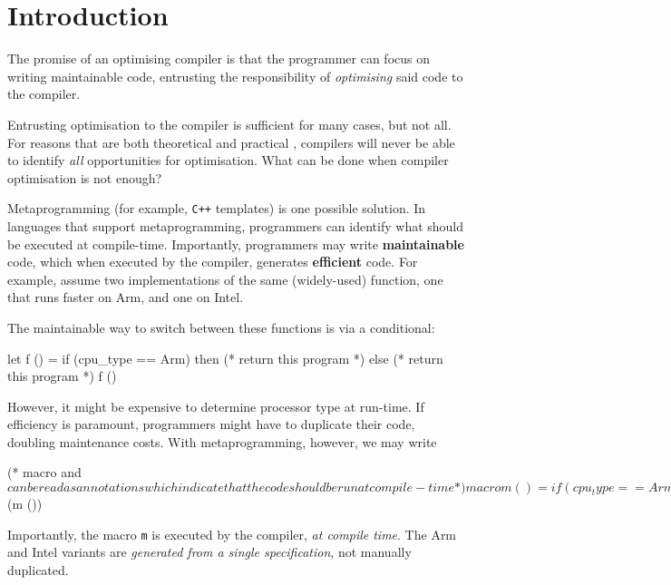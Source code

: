 \chapter{Introduction}

The promise of an optimising compiler is that the programmer can focus on writing maintainable code, entrusting the responsibility of \textit{optimising} said code to the compiler. 

Entrusting optimisation to the compiler is sufficient for many cases, but not all. For reasons that are both theoretical \citep{rice-53} and practical \citep{robinson-01}, compilers will never be able to identify \textit{all} opportunities for optimisation. What can be done when compiler optimisation is not enough?

Metaprogramming (for example, \texttt{C++} templates) \citep{abrahams-04} is one possible solution. In languages that support metaprogramming, programmers can identify what should be executed at compile-time. Importantly, programmers may write \textbf{maintainable} code, which when executed by the compiler, generates \textbf{efficient} code. For example, assume two implementations of the same (widely-used) function, one that runs faster on Arm, and one on Intel.

The maintainable way to switch between these functions is via a conditional:
\begin{ocaml}
let f () = if (cpu_type == Arm) then 
             (* return this program *)
           else 
             (* return this program *)
f ()
\end{ocaml}

However, it might be expensive to determine processor type at run-time. If efficiency is paramount, programmers might have to duplicate their code, doubling maintenance costs. With metaprogramming, however, we may write 
\begin{macocaml}
(* macro and $ can be read as annotations which 
   indicate that the code should be run at compile-time *)
macro m () = if (cpu_type == Arm) then 
               (* generate this program, to be run later *)
             else 
               (* gen this program, to be run later *)
$(m ())
\end{macocaml}
Importantly, the macro \texttt{m} is executed by the compiler, \textit{at compile time}. The Arm and Intel variants are \textit{generated from a single specification}, not manually duplicated.

